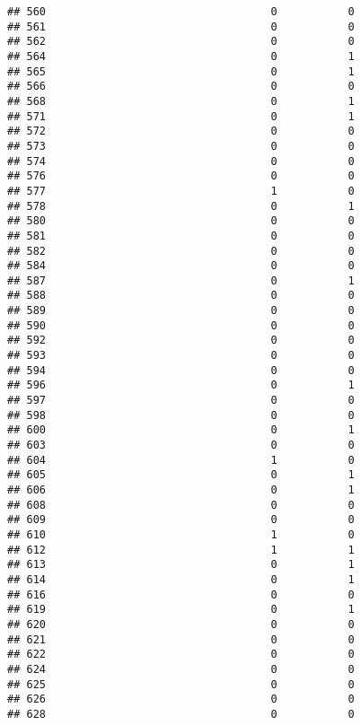 \documentclass[
]{article}
\begin{document}
\begin{verbatim}
## 560                                   0           0
## 561                                   0           0
## 562                                   0           0
## 564                                   0           1
## 565                                   0           1
## 566                                   0           0
## 568                                   0           1
## 571                                   0           1
## 572                                   0           0
## 573                                   0           0
## 574                                   0           0
## 576                                   0           0
## 577                                   1           0
## 578                                   0           1
## 580                                   0           0
## 581                                   0           0
## 582                                   0           0
## 584                                   0           0
## 587                                   0           1
## 588                                   0           0
## 589                                   0           0
## 590                                   0           0
## 592                                   0           0
## 593                                   0           0
## 594                                   0           0
## 596                                   0           1
## 597                                   0           0
## 598                                   0           0
## 600                                   0           1
## 603                                   0           0
## 604                                   1           0
## 605                                   0           1
## 606                                   0           1
## 608                                   0           0
## 609                                   0           0
## 610                                   1           0
## 612                                   1           1
## 613                                   0           1
## 614                                   0           1
## 616                                   0           0
## 619                                   0           1
## 620                                   0           0
## 621                                   0           0
## 622                                   0           0
## 624                                   0           0
## 625                                   0           0
## 626                                   0           0
## 628                                   0           0

\end{verbatim}
\end{document}
